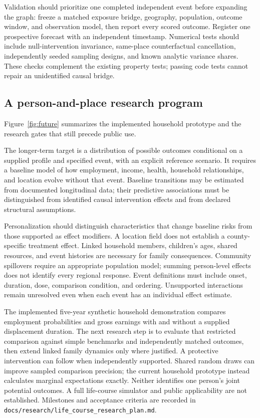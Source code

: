 \documentclass[10pt]{article}
\begin{document}
Validation should prioritize one completed independent event before
expanding the graph: freeze a matched exposure bridge, geography,
population, outcome window, and observation model, then report every
scored outcome. Register one prospective forecast with an independent
timestamp. Numerical tests should include null-intervention invariance,
same-place counterfactual cancellation, independently seeded sampling
designs, and known analytic variance shares. These checks complement
the existing property tests; passing code tests cannot repair an
unidentified causal bridge.

\subsection{A person-and-place research program}
Figure~\ref{fig:future} summarizes the implemented household prototype
and the research gates that still precede public use.


The longer-term target is a distribution of possible outcomes conditional
on a supplied profile and specified event, with an explicit reference
scenario. It requires a baseline model of how employment, income, health,
household relationships, and location evolve without that event. Baseline
transitions may be estimated from documented longitudinal data; their
predictive associations must be distinguished from identified causal
intervention effects and from declared structural assumptions.

Personalization should distinguish characteristics that change baseline
risks from those supported as effect modifiers. A location field does not
establish a county-specific treatment effect. Linked household members,
children's ages, shared resources, and event histories are necessary for
family consequences. Community spillovers require an appropriate
population model; summing person-level effects does not identify every
regional response. Event definitions must include onset, duration, dose,
comparison condition, and ordering. Unsupported interactions remain
unresolved even when each event has an individual effect estimate.

The implemented five-year synthetic household demonstration compares
employment probabilities and gross earnings with and without a supplied
displacement duration. The next research step is to evaluate that restricted
comparison against simple benchmarks and independently matched outcomes,
then extend linked family dynamics only where justified. A protective
intervention can follow when independently supported. Shared random draws
can improve sampled comparison precision; the current household prototype
instead calculates marginal expectations exactly. Neither identifies one
person's joint potential outcomes. A full life-course simulator and public
applicability are not established. Milestones and acceptance criteria are recorded in
\nolinkurl{docs/research/life_course_research_plan.md}.
\end{document}
